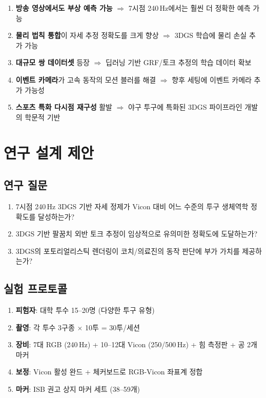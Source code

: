 \documentclass[11pt, a4paper]{report}
\begin{document}
\begin{summary}
\begin{enumerate}[leftmargin=*]
  \item \textbf{방송 영상에서도 부상 예측 가능} $\Rightarrow$ 7시점 240\,Hz에서는 훨씬 더 정확한 예측 가능
  \item \textbf{물리 법칙 통합}이 자세 추정 정확도를 크게 향상 $\Rightarrow$ 3DGS 학습에 물리 손실 추가 가능
  \item \textbf{대규모 쌍 데이터셋} 등장 $\Rightarrow$ 딥러닝 기반 GRF/토크 추정의 학습 데이터 확보
  \item \textbf{이벤트 카메라}가 고속 동작의 모션 블러를 해결 $\Rightarrow$ 향후 세팅에 이벤트 카메라 추가 가능성
  \item \textbf{스포츠 특화 다시점 재구성} 활발 $\Rightarrow$ 야구 투구에 특화된 3DGS 파이프라인 개발의 학문적 기반
\end{enumerate}
\end{summary}


\chapter{연구 설계 제안}
\label{ch:study_design}

\section{연구 질문}

\begin{enumerate}[leftmargin=*]
  \item 7시점 240\,Hz 3DGS 기반 자세 정제가 Vicon 대비 어느 수준의 투구 생체역학 정확도를 달성하는가?
  \item 3DGS 기반 팔꿈치 외반 토크 추정이 임상적으로 유의미한 정확도에 도달하는가?
  \item 3DGS의 포토리얼리스틱 렌더링이 코치/의료진의 동작 판단에 부가 가치를 제공하는가?
\end{enumerate}

\section{실험 프로토콜}

\begin{enumerate}[leftmargin=*]
  \item \textbf{피험자}: 대학 투수 15--20명 (다양한 투구 유형)
  \item \textbf{촬영}: 각 투수 3구종 $\times$ 10투 = 30투/세션
  \item \textbf{장비}: 7대 RGB (240\,Hz) + 10--12대 Vicon (250/500\,Hz) + 힘 측정판 + 공 2개 마커
  \item \textbf{보정}: Vicon 활성 완드 + 체커보드로 RGB-Vicon 좌표계 정합
  \item \textbf{마커}: ISB 권고 상지 마커 세트 (38--59개)
\end{enumerate}
\end{document}

